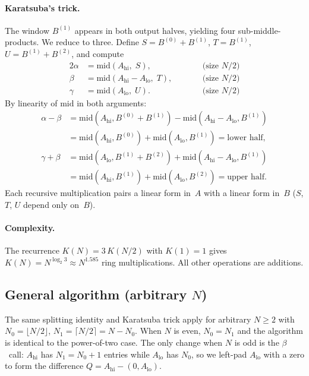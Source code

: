 \documentclass[11pt]{article}
\newcommand{\midd}{\mathrm{mid}}
\theoremstyle{plain}
\theoremstyle{remark}
\begin{document}
\paragraph{Karatsuba's trick.}
The window $B^{(1)}$ appears in both output halves,
yielding four sub-middle-products.
We reduce to three.
Define
$S = B^{(0)} + B^{(1)}$,\;
$T = B^{(1)}$,\;
$U = B^{(1)} + B^{(2)}$,
and compute
\begin{alignat*}{2}
\alpha &= \midd(A_{\mathrm{hi}},\; S),\qquad
  &&\text{(size $N/2$)}\\
\beta  &= \midd(A_{\mathrm{hi}} - A_{\mathrm{lo}},\; T),\qquad
  &&\text{(size $N/2$)}\\
\gamma &= \midd(A_{\mathrm{lo}},\; U).\qquad
  &&\text{(size $N/2$)}
\end{alignat*}
By linearity of $\midd$ in both arguments:
\begin{align*}
\alpha - \beta
&= \midd(A_{\mathrm{hi}}, B^{(0)}{+}B^{(1)})
 - \midd(A_{\mathrm{hi}}{-}A_{\mathrm{lo}}, B^{(1)}) \\
&= \midd(A_{\mathrm{hi}}, B^{(0)})
 + \midd(A_{\mathrm{lo}}, B^{(1)})
= \text{lower half,} \\[3pt]
\gamma + \beta
&= \midd(A_{\mathrm{lo}}, B^{(1)}{+}B^{(2)})
 + \midd(A_{\mathrm{hi}}{-}A_{\mathrm{lo}}, B^{(1)}) \\
&= \midd(A_{\mathrm{hi}}, B^{(1)})
 + \midd(A_{\mathrm{lo}}, B^{(2)})
= \text{upper half.}
\end{align*}
Each recursive multiplication pairs
a linear form in~$A$ with a linear form in~$B$
($S$, $T$, $U$ depend only on~$B$).

\paragraph{Complexity.}
The recurrence $K(N) = 3\,K(N/2)$ with $K(1) = 1$
gives $K(N) = N^{\log_2 3} \approx N^{1.585}$ ring multiplications.
All other operations are additions.

\subsection{General algorithm (arbitrary $N$)}\label{sec:gen-alg}

The same splitting identity and Karatsuba trick
apply for arbitrary $N \ge 2$
with $N_0 = \lfloor N/2 \rfloor$,
$N_1 = \lceil N/2 \rceil = N - N_0$.
When $N$ is even, $N_0 = N_1$ and the algorithm
is identical to the power-of-two case.
The only change when $N$ is odd is the $\beta$~call:
$A_{\mathrm{hi}}$ has $N_1 = N_0 + 1$ entries while
$A_{\mathrm{lo}}$ has $N_0$, so we left-pad $A_{\mathrm{lo}}$
with a zero to form the difference
$Q = A_{\mathrm{hi}} - (0, A_{\mathrm{lo}})$.
\end{document}
